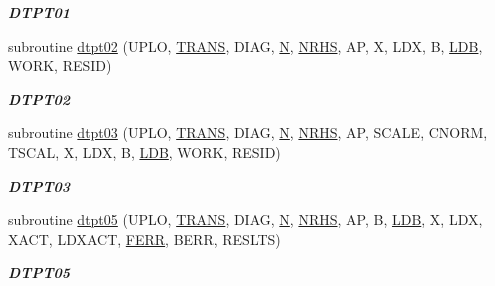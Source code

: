 \begin{DoxyCompactItemize}
\begin{DoxyCompactList}\small\item\em {\bfseries D\+T\+P\+T01} \end{DoxyCompactList}\item 
subroutine \hyperlink{group__double__lin_ga4481fbd25e287f3ea9eb0e9a14a46a1c}{dtpt02} (U\+P\+L\+O, \hyperlink{superlu__enum__consts_8h_a0c4e17b2d5cea33f9991ccc6a6678d62a1f61e3015bfe0f0c2c3fda4c5a0cdf58}{T\+R\+A\+N\+S}, D\+I\+A\+G, \hyperlink{polmisc_8c_a0240ac851181b84ac374872dc5434ee4}{N}, \hyperlink{example__user_8c_aa0138da002ce2a90360df2f521eb3198}{N\+R\+H\+S}, A\+P, X, L\+D\+X, B, \hyperlink{example__user_8c_a50e90a7104df172b5a89a06c47fcca04}{L\+D\+B}, W\+O\+R\+K, R\+E\+S\+I\+D)
\begin{DoxyCompactList}\small\item\em {\bfseries D\+T\+P\+T02} \end{DoxyCompactList}\item 
subroutine \hyperlink{group__double__lin_gad02b68092f2c71e112618d8ff0c4fe38}{dtpt03} (U\+P\+L\+O, \hyperlink{superlu__enum__consts_8h_a0c4e17b2d5cea33f9991ccc6a6678d62a1f61e3015bfe0f0c2c3fda4c5a0cdf58}{T\+R\+A\+N\+S}, D\+I\+A\+G, \hyperlink{polmisc_8c_a0240ac851181b84ac374872dc5434ee4}{N}, \hyperlink{example__user_8c_aa0138da002ce2a90360df2f521eb3198}{N\+R\+H\+S}, A\+P, S\+C\+A\+L\+E, C\+N\+O\+R\+M, T\+S\+C\+A\+L, X, L\+D\+X, B, \hyperlink{example__user_8c_a50e90a7104df172b5a89a06c47fcca04}{L\+D\+B}, W\+O\+R\+K, R\+E\+S\+I\+D)
\begin{DoxyCompactList}\small\item\em {\bfseries D\+T\+P\+T03} \end{DoxyCompactList}\item 
subroutine \hyperlink{group__double__lin_ga8520c195a92a0e6729583fe68dafea28}{dtpt05} (U\+P\+L\+O, \hyperlink{superlu__enum__consts_8h_a0c4e17b2d5cea33f9991ccc6a6678d62a1f61e3015bfe0f0c2c3fda4c5a0cdf58}{T\+R\+A\+N\+S}, D\+I\+A\+G, \hyperlink{polmisc_8c_a0240ac851181b84ac374872dc5434ee4}{N}, \hyperlink{example__user_8c_aa0138da002ce2a90360df2f521eb3198}{N\+R\+H\+S}, A\+P, B, \hyperlink{example__user_8c_a50e90a7104df172b5a89a06c47fcca04}{L\+D\+B}, X, L\+D\+X, X\+A\+C\+T, L\+D\+X\+A\+C\+T, \hyperlink{superlu__enum__consts_8h_af00a42ecad444bbda75cde1b64bd7e72a78fd14d7abebae04095cfbe02928f153}{F\+E\+R\+R}, B\+E\+R\+R, R\+E\+S\+L\+T\+S)
\begin{DoxyCompactList}\small\item\em {\bfseries D\+T\+P\+T05} \end{DoxyCompactList}\item 

\end{DoxyCompactItemize}
